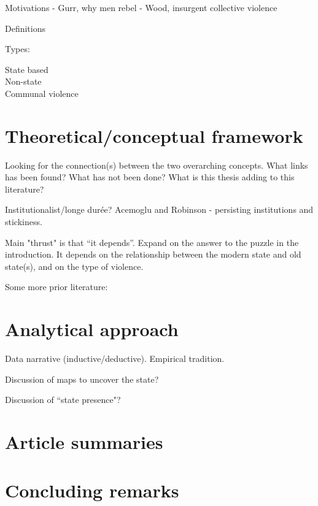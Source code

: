 \documentclass[12pt]{article}
\begin{document}
Motivations - Gurr, why men rebel - Wood, insurgent collective violence

Definitions

Types:

State based \\

Non-state \\ 

Communal violence \\

\section{Theoretical/conceptual framework} \label{Theoretical/conceptual framework}

Looking for the connection(s) between the two overarching concepts. What links
has been found? What has not been done? What is this thesis adding to this
literature? 

Institutionalist/longe durée? Acemoglu and Robinson - persisting institutions
and stickiness.

Main "thrust" is that ``it depends''. Expand on the answer to the puzzle in the
introduction. It depends on the relationship between the modern state and old
state(s), and on the type of violence.

Some more prior literature: \citet{Griffiths2016} \citet{Ahram2019}

\section{Analytical approach} \label{Analytical approach}

Data narrative (inductive/deductive). Empirical tradition.

Discussion of maps to uncover the state?

Discussion of ``state presence"?

\section{Article summaries} \label{Article summaries}

\section{Concluding remarks} \label{Concluding remarks}

\pagebreak



\end{document}
